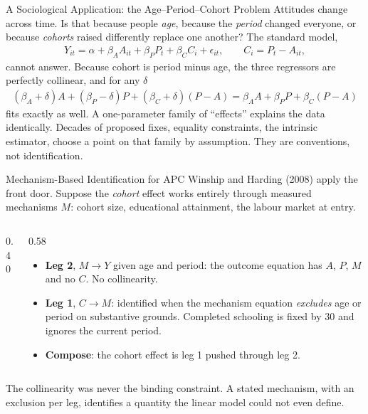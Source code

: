 \documentclass[aspectratio=169,11pt,xcolor=dvipsnames]{beamer}
\newcommand{\srct}[1]{#1}
\begin{document}
\begin{frame}{A Sociological Application: the Age--Period--Cohort Problem}
Attitudes change across time. Is that because people \emph{age}, because the
\emph{period} changed everyone, or because \emph{cohorts} raised differently
replace one another? The standard model,
\begin{align*}
  Y_{it} = \alpha + \beta_A A_{it} + \beta_P P_t + \beta_C C_i + \epsilon_{it},
  \qquad C_i = P_t - A_{it},
\end{align*}
cannot answer. Because cohort is period minus age, the three regressors are
perfectly collinear, and for any $\delta$
\begin{align*}
  (\beta_A + \delta) A + (\beta_P - \delta) P + (\beta_C + \delta)(P - A)
 = \beta_A A + \beta_P P + \beta_C (P - A)
\end{align*}
fits exactly as well. A one-parameter family of ``effects'' explains the data
identically.
\vskip3pt
Decades of proposed fixes, equality constraints, the intrinsic estimator,
choose a point on that family by assumption. They are conventions, not
identification.
\end{frame}

\begin{frame}{Mechanism-Based Identification for APC}
\srct{Winship and Harding (2008)} apply the front door. Suppose the
\emph{cohort} effect works entirely through measured mechanisms $M$: cohort
size, educational attainment, the labour market at entry.
\begin{columns}[c]
\begin{column}{0.40\textwidth}
\centering
{}
\end{column}
\begin{column}{0.58\textwidth}
\begin{itemize}\itemsep1pt
  \item \textbf{Leg 2}, $M \to Y$ given age and period: the outcome
        equation has $A$, $P$, $M$ and no $C$. No collinearity.
  \item \textbf{Leg 1}, $C \to M$: identified when the mechanism equation
        \emph{excludes} age or period on substantive grounds. Completed
        schooling is fixed by 30 and ignores the current period.
  \item \textbf{Compose}: the cohort effect is leg 1 pushed through leg 2.
\end{itemize}
\end{column}
\end{columns}
\alert{The collinearity was never the binding constraint.} A stated
mechanism, with an exclusion per leg, identifies a quantity the linear model
could not even define.
\end{frame}
\end{document}
